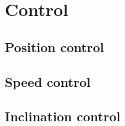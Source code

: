 \section{Control}

\subsection{Position control}

\subsection{Speed control}

\subsection{Inclination control}